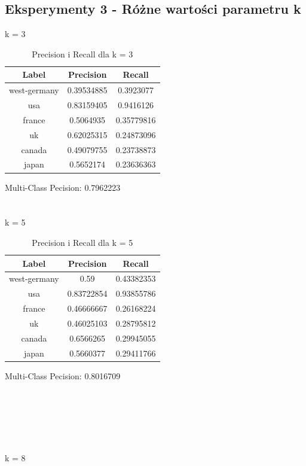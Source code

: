 \documentclass{classrep}
\begin{document}
\subsection{Eksperymenty 3 - Różne wartości parametru k}
k = 3
\begin{table}[H]
\begin{tabular}{|c|c|c|}
\hline
Label        & Precision  & Recall     \\ \hline
west-germany & 0.39534885 & 0.3923077  \\ \hline
usa          & 0.83159405 & 0.9416126  \\ \hline
france       & 0.5064935  & 0.35779816 \\ \hline
uk           & 0.62025315 & 0.24873096 \\ \hline
canada       & 0.49079755 & 0.23738873 \\ \hline
japan        & 0.5652174  & 0.23636363 \\ \hline
\end{tabular}
\caption{Precision i Recall dla k = 3}
\end{table}
Multi-Class Pecision: 0.7962223\\
\\
\\
k = 5
\begin{table}[H]
\begin{tabular}{|c|c|c|}
\hline
Label        & Precision  & Recall     \\ \hline
west-germany & 0.59       & 0.43382353 \\ \hline
usa          & 0.83722854 & 0.93855786 \\ \hline
france       & 0.46666667 & 0.26168224 \\ \hline
uk           & 0.46025103 & 0.28795812 \\ \hline
canada       & 0.6566265  & 0.29945055 \\ \hline
japan        & 0.5660377  & 0.29411766 \\ \hline
\end{tabular}
\caption{Precision i Recall dla k = 5}
\end{table}
Multi-Class Pecision: 0.8016709\\
\\
\\
\\
\\
\\
\\
k = 8
\end{document}
